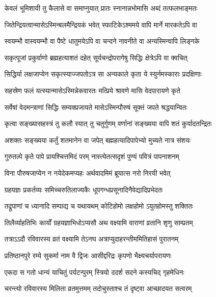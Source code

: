 \twolineshloka
{केवलं भूमिशायी तु कैलासे वा समाप्नुयात्}
{प्रातः स्नानान्नभोमासि अब्दं तत्फलभाङ्मतः} %

\twolineshloka
{जितेन्द्रियत्वान्मासेऽस्मिन्बलमैन्द्रियकं भवेत्}
{स्फाटिकेऽश्ममये वापि मार्ने मारकतेऽपि वा} %

\twolineshloka
{स्वयम्भौ वास्वयम्भौ वा पैष्टे धातुमयेऽपि वा}
{चन्दने नावनीते वा अन्यस्मिन्वापि लिङ्गके} %

\twolineshloka
{सकृत्पूजां प्रकुर्वाणो ब्रह्महत्याशतं दहेत्}
{सूर्यचन्द्रोपरागेषु सिद्धिः क्षेत्रेऽपि वा क्वचित्} %

\twolineshloka
{सिद्धिर्या लक्षजाप्येन सकृत्स्याज्जपतोऽत्र सा}
{अन्यकाले कृता ये स्युर्नमस्काराः प्रदक्षिणाः} %

\twolineshloka
{सहस्रेण फलं यत्स्यान्मासेऽस्मिन्नेकवारतः}
{मत्प्रिये श्रावणे मासि वेदपारायणे कृते} %

\twolineshloka
{सर्वेषां वेदमन्त्राणां सिद्धिः सम्यक्प्रजायते}
{मासेऽस्मिन्पौरुषं सूक्तं जपते श्रद्धयान्वितः} %

\twolineshloka
{कृत्वा सङ्ख्यासहस्त्रं तु कलौ स्यात् तु चतुर्गुणम्}
{वर्णानां सङ्ख्यया वापि शतं कुर्यादतन्द्रितः} %

\twolineshloka
{अशक्तः सङ्ख्यया कर्तुं शतमानेन वा जपेत्}
{बह्महत्यादिपापेभ्यो मुच्यते नात्र संशयः} %

\twolineshloka
{गुरुतल्पे कृते पापे प्रायश्चित्तमिदं परम्}
{नास्त्येतत्सदृशं पुण्यं पवित्रं पापनाशनम्} %

\twolineshloka
{विना पौरुषजाप्येन न नयेदेकमप्यहः}
{अर्थवादमिमं ब्रूयात्स नरो निरयी भवेत्} %

\twolineshloka
{ग्रहयज्ञः प्रकर्तव्यः समिच्चरुतिलाज्यकैः}
{धूपगन्धप्रसूनादिनैवेद्यादिप्रभेदतः} %

\twolineshloka
{तद्रूपाणां च ध्यानादि सम्पाद्य च यथायथम्}
{कोटिहोमो लक्षहोमो ऽयुतहोमस्तु शक्तितः} %

\twolineshloka
{तिलैर्व्याहतिभिः कार्यों ग्रहयज्ञाभिधोऽप्यसौ}
{अथ वक्ष्यामि वाराणां व्रतानि शृणु साम्प्रतम्} %

\twolineshloka
{तत्राऽऽदौ रविवारस्य व्रतं वक्ष्यामि तेऽनघ}
{अत्राप्युदाहरन्तीममितिहासं पुरातनम्} %

\twolineshloka
{प्रतिष्ठानपुरे रम्ये सुकर्मा नाम वै द्विजः}
{आसीद्दरिद्रः कृपणो भैक्ष्यचर्यापरायणः} %

\twolineshloka
{एकदा स गतो धान्यं याचितुं पर्यटन्पुरम्}
{स्त्रियो ददर्श सदने कस्यचिद् गृहमेधिनः} %

\twolineshloka
{चरन्त्यो रविवारस्य मिलिता व्रतमुत्तमम्}
{तदोचुस्ताश्च तं दृष्ट्वा आच्छादयत सत्वरम्} %

